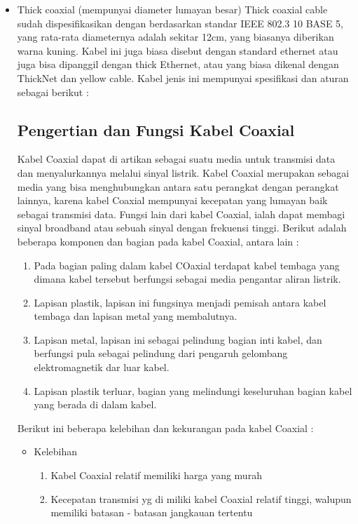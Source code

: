 	\begin{itemize}
		\item Thick coaxial (mempunyai diameter lumayan besar) Thick coaxial cable sudah dispesifikasikan dengan berdasarkan standar IEEE 802.3 10 BASE 5, yang rata-rata diameternya adalah sekitar 12cm, yang biasanya diberikan warna kuning. Kabel ini juga biasa disebut dengan standard ethernet atau juga bisa dipanggil dengan thick Ethernet, atau yang biasa dikenal dengan ThickNet dan yellow cable. Kabel jenis ini mempunyai spesifikasi dan aturan sebagai berikut :

	\subsection{Pengertian dan Fungsi Kabel Coaxial}
	Kabel Coaxial dapat di artikan sebagai suatu media untuk transmisi data dan menyalurkannya melalui sinyal listrik. Kabel Coaxial merupakan sebagai media yang bisa menghubungkan antara satu perangkat dengan perangkat lainnya, karena kabel Coaxial mempunyai kecepatan yang lumayan baik sebagai transmisi data. Fungsi lain dari kabel Coaxial, ialah dapat membagi sinyal broadband atau sebuah sinyal dengan frekuensi tinggi. Berikut adalah beberapa komponen dan bagian pada kabel Coaxial, antara lain :
		\begin{enumerate}
			\item Pada bagian paling dalam kabel COaxial terdapat kabel tembaga yang dimana kabel tersebut berfungsi sebagai media pengantar aliran listrik.
			\item Lapisan plastik, lapisan ini fungsinya menjadi pemisah antara kabel tembaga dan lapisan metal yang membalutnya.
			\item Lapisan metal, lapisan ini sebagai pelindung bagian inti kabel, dan berfungsi pula sebagai pelindung dari pengaruh gelombang elektromagnetik dar luar kabel.
			\item Lapisan plastik terluar, bagian yang melindungi keseluruhan bagian kabel yang berada di dalam kabel.
		\end{enumerate}
	Berikut ini beberapa kelebihan dan kekurangan pada kabel Coaxial :
		\begin{itemize}
			\item Kelebihan
				\begin{enumerate}
					\item Kabel Coaxial relatif memiliki harga yang murah
					\item Kecepatan transmisi yg di miliki kabel Coaxial relatif tinggi, walupun memiliki batasan - batasan jangkauan tertentu

\end{enumerate}
\end{itemize}
\end{itemize}

